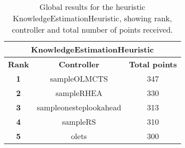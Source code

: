 \begin{table*}[!t]
\begin{center}
\begin{tabular}{|c|c|c|}
\multicolumn{3}{|c|}{\textbf{KnowledgeEstimationHeuristic}}\\
\hline
\textbf{Rank} & \textbf{Controller} & \textbf{Total points}\\
\hline
\textbf{1} & sampleOLMCTS & 347
 \\
\hline
\textbf{2} & sampleRHEA & 330
 \\
\hline
\textbf{3} & sampleonesteplookahead & 313
 \\
\hline
\textbf{4} & sampleRS & 310
 \\
\hline
\textbf{5} & olets & 300
 \\
\hline
\end{tabular}
\caption{Global results for the heuristic KnowledgeEstimationHeuristic, showing rank, controller and total number of points received.}
\label{tab:weights}
\end{center}
\end{table*}


